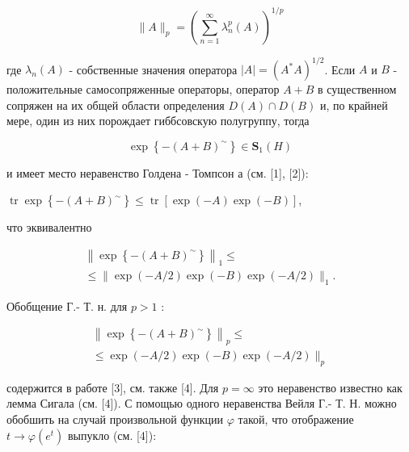 \documentclass[10pt]{article}
\begin{document}
\[

\|A\|_{p}=\left(\sum_{n=1}^{\infty} \lambda_{n}^{p}(A)\right)^{1 / p}

\]



где $\lambda_{n}(A)$ - собственные значения оператора $|A|=\left(A^{*} A\right)^{1 / 2}$. Если $A$ и $B$ - положительные самосопряженные операторы, оператор $A+B$ в существенном сопряжен на их общей области определения $D(A) \cap D(B)$ и, по крайней мере, один из них порождает гиббсовскую полугруппу, тогда



\[

\exp \left\{-(A+B)^{\sim}\right\} \in \boldsymbol{S}_{1}(H)

\]



и имеет место неравенство Голдена - Томпсон а (см. [1], [2]):



$\operatorname{tr} \exp \left\{-(A+B)^{\sim}\right\} \leqslant \operatorname{tr}[\exp (-A) \exp (-B)]$,



что эквивалентно



\[

\begin{gathered}

\left\|\exp \left\{-(A+B)^{\sim}\right\}\right\|_{1} \leqslant \\

\leqslant\|\exp (-A / 2) \exp (-B) \exp (-A / 2)\|_{1} .

\end{gathered}

\]



Обобщение Г.- Т. н. для $p>1$ :



\[

\begin{gathered}

\left\|\exp \left\{-(A+B)^{\sim}\right\}\right\|_{p} \leqslant \\

\leqslant \exp (-A / 2) \exp (-B) \exp (-A / 2) \|_{p}

\end{gathered}

\]



содержится в работе [3], см. также [4]. Для $p=\infty$ это неравенство известно как лемма Сигала (см. [4]). С помощью одного неравенства Вейля Г.- Т. Н. можно обобшить на случай произвольной функции $\varphi$ такой, что отображение $t \rightarrow \varphi\left(e^{t}\right)$ выпукло (см. [4]):
\end{document}
